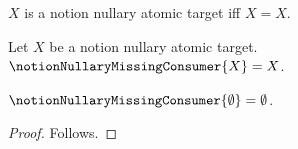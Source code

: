 

\begin{definition}\label{notion_nullary_missing_target}
    $X$ is a notion nullary atomic target iff $X=X$.
\end{definition}

\begin{definition}\label{notion_nullary_missing_consumer}
    Let $X$ be a notion nullary atomic target.
    $\notionNullaryMissingConsumer{X}=X$.
\end{definition}

\begin{proposition}\label{notion_nullary_classification_missing}
    $\notionNullaryMissingConsumer{\emptyset}=\emptyset$.
\end{proposition}
\begin{proof}
    Follows.
\end{proof}
